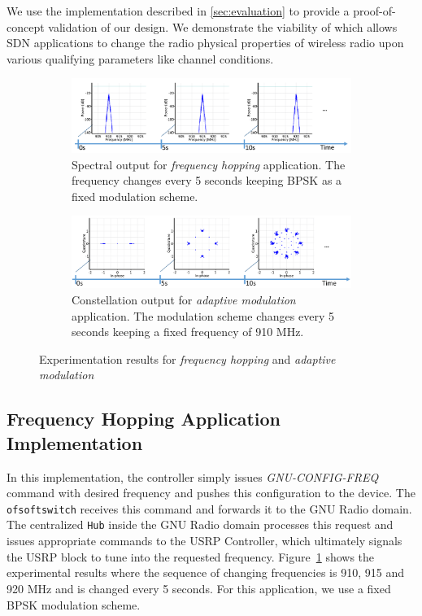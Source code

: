 We use the \crossflow implementation described in \ref{sec:evaluation} to provide a proof-of-concept validation of our design. We demonstrate the viability of \crossflow which  allows SDN applications to change the radio physical properties of wireless radio upon various qualifying parameters like channel conditions. 


\begin{figure}
\centering
  \begin{subfigure}[b]{\textwidth}
        \centering
      \includegraphics[width=1\textwidth]{figures/Freq.pdf}
      \caption{Spectral output for \emph{frequency hopping} application. The frequency changes every 5 seconds keeping BPSK as a fixed modulation scheme.}
      \label{fig:freq}
  \end{subfigure}

  \begin{subfigure}[a]{\textwidth}
  \centering
      \includegraphics[width=1\textwidth]{figures/Mod.pdf}
      \caption{Constellation output for \emph{adaptive modulation} application. The modulation scheme changes every 5 seconds keeping a fixed frequency of 910 MHz.}
      \label{fig:mod}
  \end{subfigure}%
  \caption{Experimentation results for \emph{frequency hopping} and \emph{adaptive modulation}}
\end{figure}


\subsection{Frequency Hopping Application Implementation}

In this implementation,  the controller simply issues \emph{GNU-CONFIG-FREQ} command with desired frequency and pushes this configuration to the device. The \texttt{ofsoftswitch} receives this command and forwards it to the GNU Radio domain. The centralized \texttt{\crossflow Hub} inside the GNU Radio domain processes this request and issues appropriate commands to the  USRP Controller, which ultimately signals the USRP block to tune into the requested frequency. Figure~\ref{fig:freq} shows the experimental results where the sequence of changing frequencies is 910, 915 and 920 MHz and is changed every 5 seconds. For this application, we use a fixed BPSK modulation scheme.


